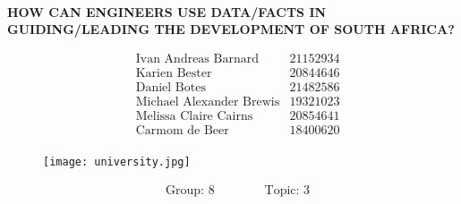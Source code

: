 \begin{titlepage}

\begin{center}
\Large\textbf{\\\MakeUppercase{How can engineers use data/facts in guiding/leading the development of South Africa?}}\par
\end{center}

\Large
\begin{center}
\begin{align*}
&\text{Ivan Andreas Barnard} & \text{21152934}\\
&\text{Karien Bester} & \text{20844646}\\
&\text{Daniel Botes} & \text{21482586}\\
&\text{Michael Alexander Brewis} & \text{19321023}\\
&\text{Melissa Claire Cairns} & \text{20854641}\\
&\text{Carmom de Beer} & \text{18400620}\\
\end{align*}
\end{center}

\begin{figure}[H]
	\begin{center}
	\texttt{[image: university.jpg]}
	\end{center}	
\end{figure}
\Large

\vfill
\begin{center}
\begin{align*}
&\text{Group: 8} &&&&& \text{Topic: 3}\\
\end{align*}
\end{center}	
\end{titlepage}